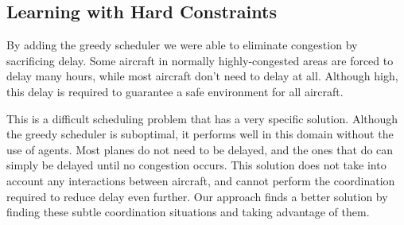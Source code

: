 \documentclass{aamas2014}
\begin{document}
%
%

\subsection{Learning with Hard Constraints}
By adding the greedy scheduler we were able to eliminate congestion by sacrificing delay. Some aircraft in normally highly-congested areas are forced to delay many hours, while most aircraft don't need to delay at all. Although high, this delay is required to guarantee a safe environment for all aircraft. 

This is a difficult scheduling problem that has a very specific solution. Although the greedy scheduler is suboptimal, it performs well in this domain without the use of agents. Most planes do not need to be delayed, and the ones that do can simply be delayed until no congestion occurs. This solution does not take into account any interactions between aircraft, and cannot perform the coordination required to reduce delay even further. Our approach finds a better solution by finding these subtle coordination situations and taking advantage of them.  
\end{document}
